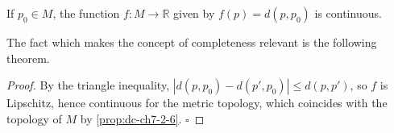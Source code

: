 \begin{corollary}
  \label{cor:dc-ch7-2-7}
  \leanok
  If $p_0\in M$, the function $f:M\to\mathbb{R}$ given by $f(p)=d(p,p_0)$ is
  continuous.

  The fact which makes the concept of completeness relevant is the following
  theorem.
\end{corollary}
\begin{proof}
  \leanok
  By the triangle inequality, $|d(p,p_0)-d(p',p_0)|\le d(p,p')$, so $f$ is
  Lipschitz, hence continuous for the metric topology, which coincides with
  the topology of $M$ by \cref{prop:dc-ch7-2-6}. $\square$
\end{proof}

